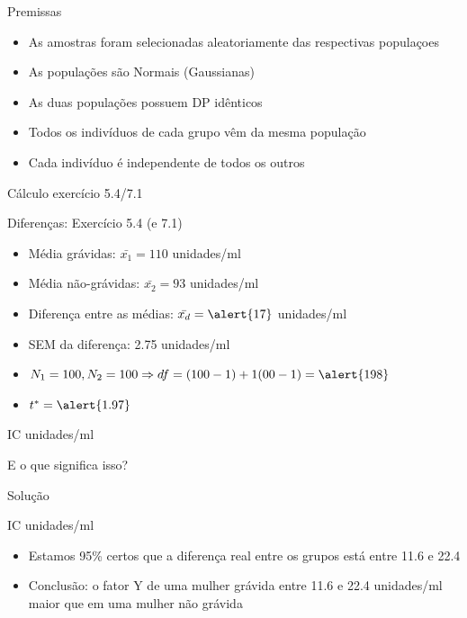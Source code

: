 \documentclass{beamer}
\begin{document}
\begin{frame}{Premissas}
  \begin{itemize}
  \item As amostras foram selecionadas aleatoriamente das respectivas populaçoes
  \item As populações são Normais (Gaussianas)
  \item As duas populações possuem DP idênticos
  \item Todos os indivíduos de cada grupo vêm da mesma população
  \item Cada indivíduo é independente de todos os outros
  \end{itemize}
\end{frame}


\begin{frame}{Cálculo exercício 5.4/7.1}
  \begin{exampleblock}{Diferenças: Exercício 5.4 (e 7.1)}
    \begin{itemize}
    \item Média grávidas: $\bar{x_1} = 110$ unidades/ml
    \item Média não-grávidas: $\bar{x_2} = 93$ unidades/ml
    \item Diferença entre as médias: $\bar{x_d} = \alert{17}$ unidades/ml
    \item SEM da diferença: \alert{2.75} unidades/ml
    \item $N_1=100, N_2=100 \Rightarrow df = (100 -1) + 1(00 - 1) = \alert{198}$
    \item $t^{*} = \alert{1.97}$
    \end{itemize}
  \end{exampleblock}
  \begin{exampleblock}{IC}
    \centering
    [11.6, 22.4] unidades/ml
  \end{exampleblock}
  E o que significa isso?
\end{frame}

\begin{frame}{Solução}
    \begin{exampleblock}{IC}
    \centering
    [11.6, 22.4] unidades/ml
  \end{exampleblock}
  \begin{itemize}
  \item Estamos 95\% certos que a diferença real entre os grupos está entre 11.6 e 22.4
  \item Conclusão: o fator Y de uma mulher grávida entre 11.6 e 22.4 unidades/ml maior que em uma mulher não grávida
  \end{itemize}
\end{frame}
\end{document}
